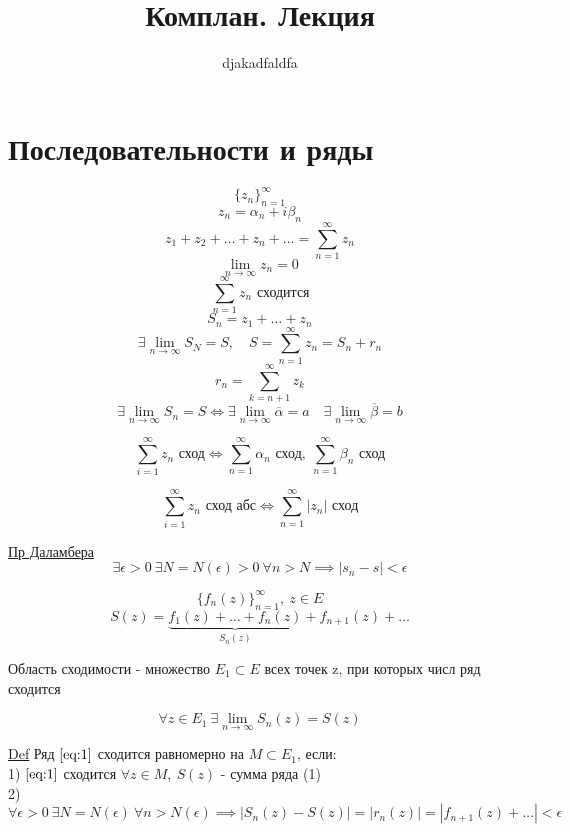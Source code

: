 \documentclass[a4paper]{article}
\begin{document}
\title{Комплан. Лекция}
\author{djakadfaldfa}
\maketitle

\section*{\centering Последовательности и ряды}
\[
    \{ z_n \}_{n=1}^{\infty}
\]
\[
    z_n = \alpha_n + i \beta_n
\]
\[
    z_1 + z_2 + \dots + z_n + \dots = \sum_{n=1}^{\infty} z_n 
\]
\[
    \lim_{n \to \infty} z_n = 0
\]
\[
    \sum_{n=1}^{\infty} z_n \text{ сходится}
\]
\[
    S_n = z_1 + \dots + z_n
\]
\[
    \exists \lim_{n \to \infty} S_N = S, \quad S = \sum_{n=1}^{\infty} z_n = 
    S_n + r_n
\]
\[
    r_n = \sum_{k = n + 1}^{\infty} z_k
\]
\[
    \exists \lim_{n \to \infty} S_n = S \iff \exists \lim_{n \to \infty} \overline{\alpha}
    = a \quad
    \exists \lim_{n \to \infty} \overline{\beta} = b
\]

\[
    \sum_{i=1}^{\infty} z_n \text{ сход} \iff \sum_{n=1}^{\infty} \alpha_n 
    \text{ сход}, \ \sum_{n=1}^{\infty} \beta_n \text{ сход}
\]

\[
    \sum_{i=1}^{\infty} z_n \text{ сход абс} \iff \sum_{n=1}^{\infty} |z_n| 
    \text{ сход}
\]

\begin{tcolorbox}
\underline{Пр Даламбера}
\[
    \exists \epsilon > 0 \ \exists N = N(\epsilon) > 0 \ \forall n > N \implies
    |s_n - s| < \epsilon
\]
\end{tcolorbox}

\[
    \{ f_n(z) \}_{n = 1}^{\infty}, \ z \in E
\]
\begin{equation}
    S(z) = \underbrace{f_1(z) + \dots + f_n(z)}_{S_n(z)} + f_{n+1}(z) + \dots
    \label{eq:1}
\end{equation}

\begin{tcolorbox}
    Область сходимости - множество $ E_1 \subset E $ всех точек z, при которых числ
    ряд сходится
\end{tcolorbox}
\[
    \forall z \in E_1 \ \exists \lim_{n \to \infty} S_n(z) = S(z)
\]

\begin{tcolorbox}
    \underline{Def} Ряд $ \ref{eq:1} $ сходится равномерно на $ M \subset E_1 $, если:\\
    1) $ \ref{eq:1} $ сходится $ \forall z \in M, \ S(z)$ - сумма ряда (1)\\
    2)
    \[
        \forall \epsilon > 0 \ \exists N = N(\epsilon) \ \forall n > N(\epsilon)
        \implies | S_n(z) - S(z) | = |r_n(z)| = | f_{n+1}(z) + \dots | < \epsilon
    \]
\end{tcolorbox}
\end{document}
